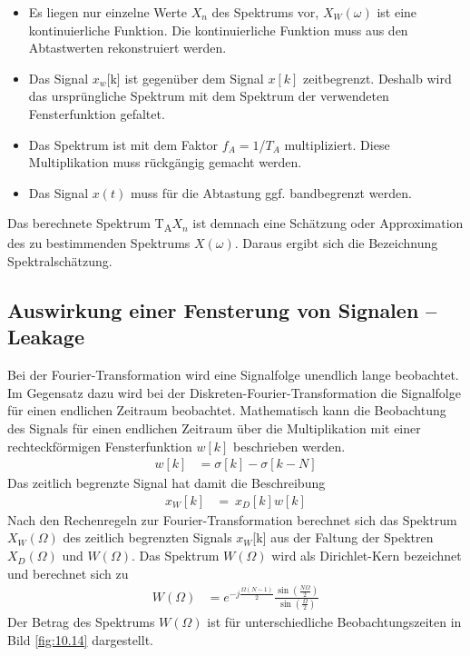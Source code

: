 \begin{itemize}
\item
  Es liegen nur einzelne Werte \(X_{n}\) des Spektrums vor, \(X_{W}(ω)\) ist eine kontinuierliche Funktion. Die kontinuierliche Funktion muss aus den Abtastwerten rekonstruiert werden.
\item
  Das Signal \(x_{w}\){[}k{]} ist gegenüber dem Signal \(x[k]\) zeitbegrenzt. Deshalb wird das ursprüngliche Spektrum mit dem Spektrum der verwendeten Fensterfunktion gefaltet.
\item
  Das Spektrum ist mit dem Faktor \(f_{A} = 1\)/\(T_{A}\) multipliziert. Diese Multiplikation muss rückgängig gemacht werden.
\item
  Das Signal \(x(t)\) muss für die Abtastung ggf. bandbegrenzt werden.
\end{itemize}

Das berechnete Spektrum T\textsubscript{A}\(X_{n}\) ist demnach eine Schätzung oder Approximation des zu bestimmenden Spektrums \(X(ω)\). Daraus ergibt sich die Bezeichnung Spektralschätzung.

\subsection{Auswirkung einer Fensterung von Signalen -- Leakage}\label{sec:10.3.2}

Bei der Fourier-Transformation wird eine Signalfolge unendlich lange beobachtet. Im Gegensatz dazu wird bei der Diskreten-Fourier-Transformation die Signalfolge für einen endlichen Zeitraum beobachtet. Mathematisch kann die Beobachtung des Signals für einen endlichen Zeitraum über die Multiplikation mit einer rechteckförmigen Fensterfunktion \(w[k]\) beschrieben werden.
\begin{align}
w[ k] &= \sigma[ k] - \sigma[ k - N] \label{eq:10.58}
\end{align}
Das zeitlich begrenzte Signal hat damit die Beschreibung
\begin{align}
x_{W}[ k] &= \ x_{D}[ k]  w[ k] \label{eq:10.59}
\end{align}
Nach den Rechenregeln zur Fourier-Transformation berechnet sich das Spektrum \(X_{W}(Ω)\) des zeitlich begrenzten Signals \(x_{W}\){[}k{]} aus der Faltung der Spektren \(X_{D}(Ω)\) und \(W(Ω)\). Das Spektrum \(W(Ω)\) wird als Dirichlet-Kern bezeichnet und berechnet sich zu
\begin{align}
W(\Omega) &= e^{- j  \frac{\Omega  (N - 1)}{2}}  \frac{\sin\left( \frac{N  \Omega}{2} \right)}{\sin\left( \frac{\Omega}{2} \right)} \label{eq:10.60}
\end{align}
Der Betrag des Spektrums \(W(Ω)\) ist für unterschiedliche Beobachtungszeiten in Bild \ref{fig:10.14} dargestellt.

